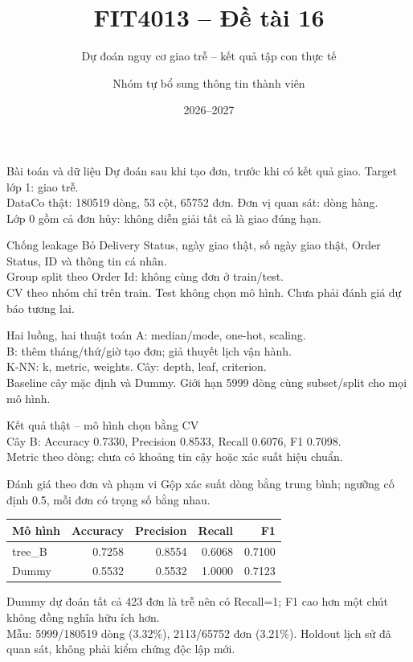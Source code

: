 ﻿\documentclass[aspectratio=169]{beamer}
\title{FIT4013 -- Đề tài 16}
\subtitle{Dự đoán nguy cơ giao trễ -- kết quả tập con thực tế}
\author{Nhóm tự bổ sung thông tin thành viên}
\date{2026--2027}
\begin{document}
\frame{\titlepage}
\begin{frame}{Bài toán và dữ liệu}
Dự đoán sau khi tạo đơn, trước khi có kết quả giao. Target lớp 1: giao trễ.\\
DataCo thật: 180519 dòng, 53 cột, 65752 đơn. Đơn vị quan sát: dòng hàng.\\
Lớp 0 gồm cả đơn hủy: không diễn giải tất cả là giao đúng hạn.
\end{frame}
\begin{frame}{Chống leakage}
Bỏ Delivery Status, ngày giao thật, số ngày giao thật, Order Status, ID và thông tin cá nhân.\\
Group split theo Order Id: không cùng đơn ở train/test.\\
CV theo nhóm chỉ trên train. Test không chọn mô hình. Chưa phải đánh giá dự báo tương lai.
\end{frame}
\begin{frame}{Hai luồng, hai thuật toán}
A: median/mode, one-hot, scaling.\\
B: thêm tháng/thứ/giờ tạo đơn; giả thuyết lịch vận hành.\\
K-NN: k, metric, weights. Cây: depth, leaf, criterion.\\
Baseline cây mặc định và Dummy. Giới hạn 5999 dòng cùng subset/split cho mọi mô hình.
\end{frame}
\begin{frame}{Kết quả thật -- mô hình chọn bằng CV}
\resizebox{\textwidth}{!}{}\\
Cây B: Accuracy 0.7330, Precision 0.8533, Recall 0.6076, F1 0.7098.\\
Metric theo dòng; chưa có khoảng tin cậy hoặc xác suất hiệu chuẩn.
\end{frame}
\begin{frame}{Đánh giá theo đơn và phạm vi}
Gộp xác suất dòng bằng trung bình; ngưỡng cố định 0.5, mỗi đơn có trọng số bằng nhau.
\begin{center}
\begin{tabular}{lrrrr}
\hline
Mô hình & Accuracy & Precision & Recall & F1 \\
\hline
tree\_B & 0.7258 & 0.8554 & 0.6068 & 0.7100 \\
Dummy & 0.5532 & 0.5532 & 1.0000 & 0.7123 \\
\hline
\end{tabular}
\end{center}
Dummy dự đoán tất cả 423 đơn là trễ nên có Recall=1; F1 cao hơn một chút không đồng nghĩa hữu ích hơn.\\
Mẫu: 5999/180519 dòng (3.32\%), 2113/65752 đơn (3.21\%). Holdout lịch sử đã quan sát, không phải kiểm chứng độc lập mới.
\end{frame}
\end{document}

